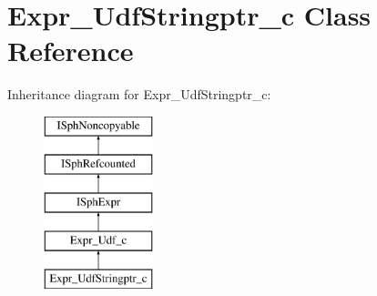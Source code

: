\hypertarget{classExpr__UdfStringptr__c}{\section{Expr\-\_\-\-Udf\-Stringptr\-\_\-c Class Reference}
\label{classExpr__UdfStringptr__c}
}
Inheritance diagram for Expr\-\_\-\-Udf\-Stringptr\-\_\-c\-:\begin{figure}[H]
\begin{center}
\leavevmode
\includegraphics[height=5.000000cm]{classExpr__UdfStringptr__c}
\end{center}
\end{figure}
